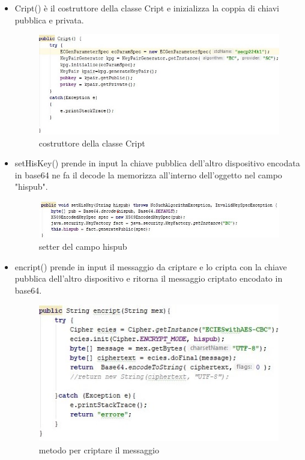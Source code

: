 \begin{itemize}
   \item Cript() è il costruttore della classe Cript e
   inizializza la coppia di chiavi pubblica e privata.
   \begin{figure}
       \caption{costruttore della classe Cript}
       \includegraphics[width=1\columnwidth]{imgs/Criptconstructor.jpg}
   \end{figure}
   \item setHisKey() prende in input la chiave pubblica dell'altro dispositivo
   encodata in base64 ne fa il decode la memorizza all'interno dell'oggetto
   nel campo "hispub".
   \begin{figure}
       \caption{setter del campo hispub}
       \includegraphics[width=1  \columnwidth]{imgs/sethiskey.jpg}
   \end{figure}
  \item encript() prende in input il messaggio da criptare e lo cripta con la
   chiave pubblica dell'altro dispositivo e ritorna il messaggio criptato
   encodato in base64.
   \begin{figure}
       \caption{metodo per criptare il messaggio}
       \includegraphics[width=0.8  \columnwidth]{imgs/encript.jpg}

\end{figure}
\end{itemize}
